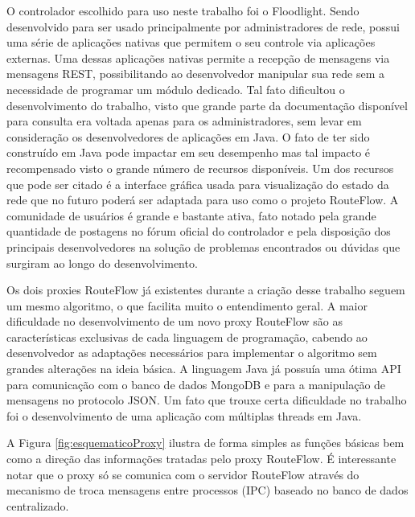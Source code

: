 O controlador escolhido para uso neste trabalho foi 
o Floodlight. Sendo desenvolvido para ser usado
principalmente por  administradores de rede, possui uma 
série de aplicações nativas que permitem o seu controle
via aplicações externas. Uma dessas aplicações nativas 
permite a recepção de mensagens via mensagens REST,
possibilitando ao desenvolvedor manipular sua rede sem
a necessidade de programar um módulo dedicado. Tal fato
dificultou o desenvolvimento do trabalho, visto que grande 
parte da documentação disponível para consulta era voltada
apenas para os administradores, sem levar em consideração os 
desenvolvedores de aplicações em Java. O fato
de ter sido construído em Java pode impactar em seu desempenho
mas tal impacto é recompensado visto o grande número de 
recursos disponíveis. Um dos recursos que pode ser citado
é a interface gráfica usada para visualização do estado da rede que
no futuro poderá ser adaptada para uso como o projeto 
RouteFlow. A comunidade de usuários é grande e bastante
ativa, fato notado pela grande quantidade de postagens no
fórum oficial do controlador e pela disposição dos principais
desenvolvedores na solução de problemas encontrados ou
dúvidas que surgiram ao longo do desenvolvimento.

Os dois proxies RouteFlow já existentes durante a 
criação desse trabalho seguem um mesmo algoritmo, o que 
facilita muito o entendimento geral. A maior dificuldade no
desenvolvimento de um novo proxy RouteFlow são
as características exclusivas de cada linguagem de programação,
cabendo ao desenvolvedor as adaptações necessários para 
implementar o algoritmo sem grandes alterações
na ideia básica. A linguagem Java já possuía uma
ótima API para comunicação com o banco de dados MongoDB
e para a manipulação de mensagens no protocolo JSON. Um fato
que trouxe certa dificuldade no trabalho foi o desenvolvimento
de uma aplicação com múltiplas threads em Java. 

A Figura \ref{fig:esquematicoProxy} ilustra de forma simples as
funções básicas bem como a direção das informações tratadas
pelo proxy RouteFlow. É interessante notar que o 
proxy só se comunica com o servidor RouteFlow através
do mecanismo de troca mensagens entre processos (IPC) baseado
no banco de dados centralizado.
\newline
\newline
\newline
\newline


